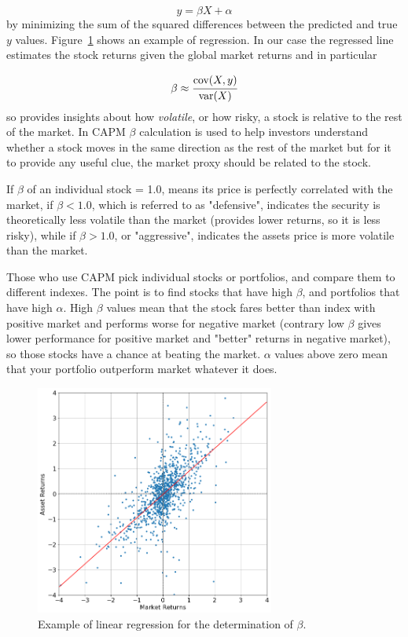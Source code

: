 \begin{equation}
	y=\beta X + \alpha
\end{equation}
by minimizing the sum of the squared differences between the predicted and true $y$ values.
Figure~\ref{fig:linear_regression} shows an example of regression. 
In our case the regressed line estimates the stock returns given the global market returns and in particular 

\begin{equation}
	\beta \approx \cfrac{\textrm{cov}(X,y)}{\textrm {var}(X)}
\end{equation}
so provides insights about how \emph{volatile}, or how risky, a stock is relative to the rest of the market.
In CAPM $\beta$ calculation is used to help investors understand whether a stock moves in the same direction as the rest of the market but for it to provide any useful clue, the market proxy should be related to the stock.

If $\beta$ of an individual stock = 1.0, means its price is perfectly correlated with the market, if $\beta < 1.0$, which is referred to as "defensive", indicates the security is theoretically less volatile than the market (provides lower returns, so it is less risky), while if $\beta > 1.0$, or "aggressive", indicates the assets price is more volatile than the market.

Those who use CAPM pick individual stocks or portfolios, and compare them to different indexes. The point is to find stocks that have high $\beta$, and portfolios that have high $\alpha$. High $\beta$ values mean that the stock fares better than index with positive market and performs worse for negative market (contrary low $\beta$ gives lower performance for positive market and "better" returns in negative market), so those stocks have a chance at beating the market. $\alpha$ values above zero mean that your portfolio outperform market whatever it does.

\begin{figure}[htb]
	\centering
	\includegraphics[width=0.7\textwidth]{figures/linear_regression}
	\caption{Example of linear regression for the determination of $\beta$.}
	\label{fig:linear_regression}
\end{figure}

